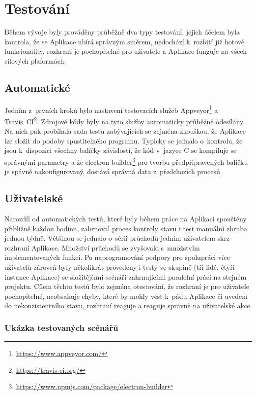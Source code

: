 \chapter{Testování}

Během vývoje byly prováděny průběžně dva typy testování, jejich účelem byla kontrola, že se Aplikace ubírá správným směrem, nedochází k~rozbití již hotové funkcionality, rozhraní je pochopitelné pro uživatele a Aplikace funguje na všech cílových plaformách.

\section{Automatické}

Jedním z~prvních kroků bylo nastavení testovacích služeb Appveyor\footnote{\url{https://www.appveyor.com/}} a Travis~CI\footnote{\url{https://travis-ci.org/}}. Zdrojové kódy byly na tyto služby automaticky průběžně odesílány. Na nich pak probíhala sada testů zabývajících se zejména zkouškou, že Aplikace lze složit do podoby spustitelného programu. Typicky se jednalo o~kontrolu, že jsou k~dispozici všechny balíčky závislostí, že kód v~jazyce C se kompiluje se správnými parametry a že electron-builder\footnote{\url{https://www.npmjs.com/package/electron-builder}} pro tvorbu předpřipravených balíčku je spávně nakonfigurovaný, dostává správná data z~předchozích procesů.

\section{Uživatelské}

Narozdíl od automatických testů, které byly během práce na Aplikaci spouštěny přibližně každou hodinu, zahrnoval proces kontroly stavu i test manuální zhruba jednou týdně. Většinou se jednalo o~sérii průchodů jedním uživatelem skrz rozhraní Aplikace. Množství průchodů se zvyšovalo s~množstvím implementovaných funkcí. Po naprogramování podpory pro spolupráci více uživatelů zároveň byly několikrát provedeny i testy ve skupině (tři lidé, čtyři instance Aplikace) se složitějšími scénáři zahrnujícími paralelní práci na stejném projektu. Cílem těchto testů bylo zejména otestování, že rozhraní je pro uživatele pochopitelné, neobsahuje chyby, které by mohly vést k~pádu Aplikace či uvedení do nekonzistentního stavu, rozhraní reaguje a reaguje správně na uživatelské akce.

\subsection{Ukázka testovaných scénářů}

